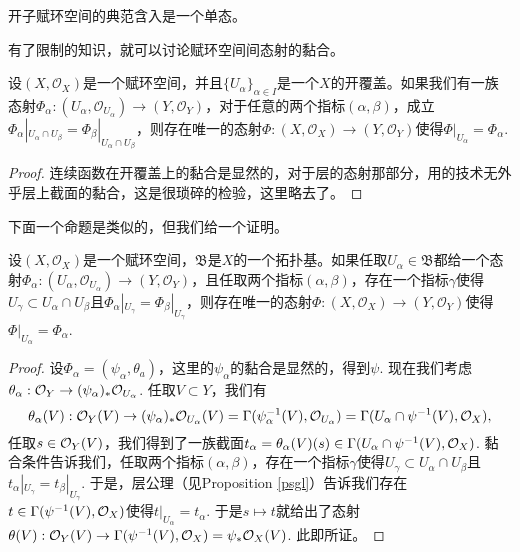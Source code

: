 \begin{coro}\label{coro:1.21}
开子赋环空间的典范含入是一个单态。
\end{coro}

有了限制的知识，就可以讨论赋环空间间态射的黏合。

\begin{pro}
设$(X,\mathcal{O}_X)$是一个赋环空间，并且$\{U_\alpha\}_{\alpha\in I}$是一个$X$的开覆盖。如果我们有一族态射$\Phi_\alpha:(U_{\alpha},\mathcal{O}_{U_{\alpha}})\to (Y,\mathcal{O}_Y)$，对于任意的两个指标$(\alpha,\beta)$，成立$\Phi_\alpha|_{U_{\alpha}\cap U_{\beta}}=\Phi_\beta|_{U_{\alpha}\cap U_{\beta}}$，则存在唯一的态射$\Phi:(X,\mathcal{O}_{X})\to (Y,\mathcal{O}_Y)$使得$\Phi|_{U_{\alpha}}=\Phi_\alpha$.
\end{pro}

\begin{proof} 连续函数在开覆盖上的黏合是显然的，对于层的态射那部分，用的技术无外乎层上截面的黏合，这是很琐碎的检验，这里略去了。\end{proof}

下面一个命题是类似的，但我们给一个证明。

\begin{pro}\label{rsnh}
设$(X,\mathcal{O}_X)$是一个赋环空间，$\mathfrak{B}$是$X$的一个拓扑基。如果任取$U_\alpha\in \mathfrak{B}$都给一个态射$\Phi_\alpha:(U_{\alpha},\mathcal{O}_{U_{\alpha}})\to (Y,\mathcal{O}_Y)$，且任取两个指标$(\alpha,\beta)$，存在一个指标$\gamma$使得$U_\gamma\subset U_\alpha\cap U_\beta$且$\Phi_\alpha|_{U_\gamma}=\Phi_\beta|_{U_\gamma}$，则存在唯一的态射$\Phi:(X,\mathcal{O}_{X})\to (Y,\mathcal{O}_Y)$使得$\Phi|_{U_{\alpha}}=\Phi_\alpha$.
\end{pro}

\begin{proof}
设$\Phi_\alpha=(\psi_\alpha,\theta_a)$，这里的$\psi_\alpha$的黏合是显然的，得到$\psi$. 现在我们考虑$\theta_\alpha:\mathcal{O}_Y\to (\psi_\alpha)_*\mathcal{O}_{U_\alpha}$. 任取$V\subset Y$，我们有
\[
	\theta_\alpha(V):\mathcal{O}_Y(V)\to (\psi_\alpha)_*\mathcal{O}_{U_\alpha}(V)=\Gamma(\psi_\alpha^{-1}(V),\mathcal{O}_{U_\alpha})=\Gamma(U_\alpha\cap\psi^{-1}(V),\mathcal{O}_{X}),
\]
任取$s\in \mathcal{O}_Y(V)$，我们得到了一族截面$t_\alpha=\theta_\alpha(V)(s)\in\Gamma(U_\alpha\cap\psi^{-1}(V),\mathcal{O}_{X})$. 黏合条件告诉我们，任取两个指标$(\alpha,\beta)$，存在一个指标$\gamma$使得$U_\gamma\subset U_\alpha\cap U_\beta$且$t_\alpha|_{U_\gamma}=t_\beta|_{U_\gamma}$. 于是，层公理（见Proposition \ref{psgl}）告诉我们存在$t\in\Gamma(\psi^{-1}(V),\mathcal{O}_{X})$使得$t|_{U_\alpha}=t_\alpha$. 于是$s\mapsto t$就给出了态射$\theta(V):\mathcal{O}_Y(V)\to \Gamma(\psi^{-1}(V),\mathcal{O}_{X})=\psi_*\mathcal{O}_X(V)$. 此即所证。
\end{proof}

